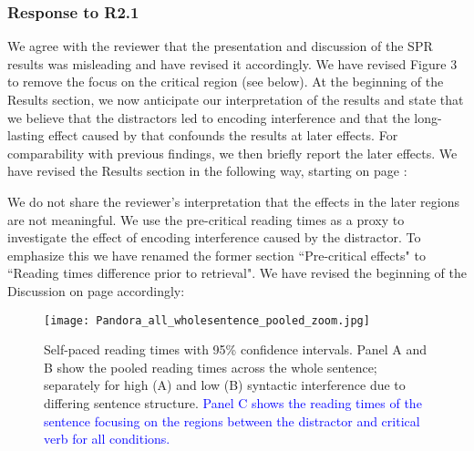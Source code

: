 \documentclass[12pt]{article}
\begin{document}
\subsubsection*{Response to R2.1}
We agree with the reviewer that the presentation and discussion of the SPR results was misleading and have revised it accordingly. We have revised Figure 3 to remove the focus on the critical region (see below). At the beginning of the Results section, we now anticipate our interpretation of the results and state that we believe that the distractors led to encoding interference and that the long-lasting effect caused by that confounds the results at later effects. For comparability with previous findings, we then briefly report the later effects. We have revised the Results section in the following way, starting on page \pageref{revised_SPR}: 

\begin{quote}
\end{quote}

We do not share the reviewer's interpretation that the effects in the later regions are not meaningful. We use the pre-critical reading times as a proxy to investigate the effect of encoding interference caused by the distractor. To emphasize this we have renamed the former section ``Pre-critical effects" to ``Reading times difference prior to retrieval". We have revised the beginning of the Discussion on page \pageref{prior_to_retrieval} accordingly: 

\begin{quote}
\end{quote}

\setcounter{figure}{2}

\begin{sidewaysfigure}[h]
    \caption{Self-paced reading times with 95\% confidence intervals. Panel A and B show the pooled reading times across the whole sentence; separately for high (A) and low (B) syntactic interference due to differing sentence structure. \textcolor{blue}{Panel C shows the reading times of the sentence focusing on the regions between the distractor and critical verb for all conditions.}}
    \label{fig:whole_sentence}
    \centering
    \texttt{[image: Pandora\_all\_wholesentence\_pooled\_zoom.jpg]}
\end{sidewaysfigure}
\clearpage
\end{document}
